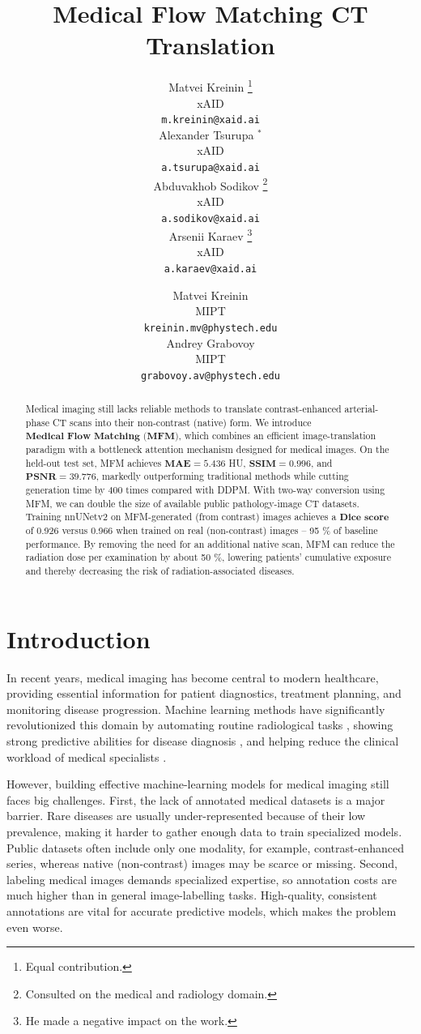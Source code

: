 \documentclass{article}
\title{Medical Flow Matching CT Translation}
\author{
  Matvei Kreinin \thanks{Equal contribution.} \\
  xAID \\
  \texttt{m.kreinin@xaid.ai} \\
  \And
  Alexander Tsurupa $^*$ \\ %
  xAID \\
  \texttt{a.tsurupa@xaid.ai} \\
  \And 
  Abduvakhob Sodikov \thanks{Consulted on the medical and radiology domain.}\\
  xAID \\
  \texttt{a.sodikov@xaid.ai} \\
  \And 
  Arsenii Karaev \thanks{He made a negative impact on the work.}\\
  xAID \\
  \texttt{a.karaev@xaid.ai}
}
\author{%
  Matvei Kreinin  \\
  MIPT \\
  \texttt{kreinin.mv@phystech.edu} \\
  \And
  Andrey Grabovoy \\
  MIPT \\
  \texttt{grabovoy.av@phystech.edu}
}
\begin{document}
\maketitle

\begin{abstract}
Medical imaging still lacks reliable methods to translate contrast-enhanced arterial-phase CT scans into their non-contrast (native) form. We introduce $\textbf{Medical Flow Matching (MFM)}$, which combines an efficient image-translation paradigm with a bottleneck attention mechanism designed for medical images. On the held-out test set, MFM achieves $\textbf{MAE}=5.436$ HU, $\textbf{SSIM}=0.996$, and $\textbf{PSNR}=39.776$, markedly outperforming traditional methods while cutting generation time by $400$ times compared with DDPM. With two-way conversion using MFM, we can double the size of available public pathology-image CT datasets. Training nnUNetv2 on MFM-generated (from contrast) images achieves a $\textbf{Dice score}$ of 0.926 versus 0.966 when trained on real (non-contrast) images -- 95 \% of baseline performance. By removing the need for an additional native scan, MFM can reduce the radiation dose per examination by about 50 \%, lowering patients’ cumulative exposure and thereby decreasing the risk of radiation-associated diseases.
\end{abstract}

\section{Introduction}
In recent years, medical imaging has become central to modern healthcare, providing essential information for patient diagnostics, treatment planning, and monitoring disease progression. Machine learning methods have significantly revolutionized this domain by automating routine radiological tasks \citep{mckinney2020international, ardila2019end}, showing strong predictive abilities for disease diagnosis \citep{esteva2017dermatologist, gulshan2016development}, and helping reduce the clinical workload of medical specialists \citep{topol2019high, dembrower2023artificial}.

However, building effective machine-learning models for medical imaging still faces big challenges. First, the lack of annotated medical datasets is a major barrier. Rare diseases are usually under-represented because of their low prevalence, making it harder to gather enough data to train specialized models. Public datasets often include only one modality, for example, contrast-enhanced series, whereas native (non-contrast) images may be scarce or missing. Second, labeling medical images demands specialized expertise, so annotation costs are much higher than in general image-labelling tasks. High-quality, consistent annotations are vital for accurate predictive models, which makes the problem even worse.
\end{document}
